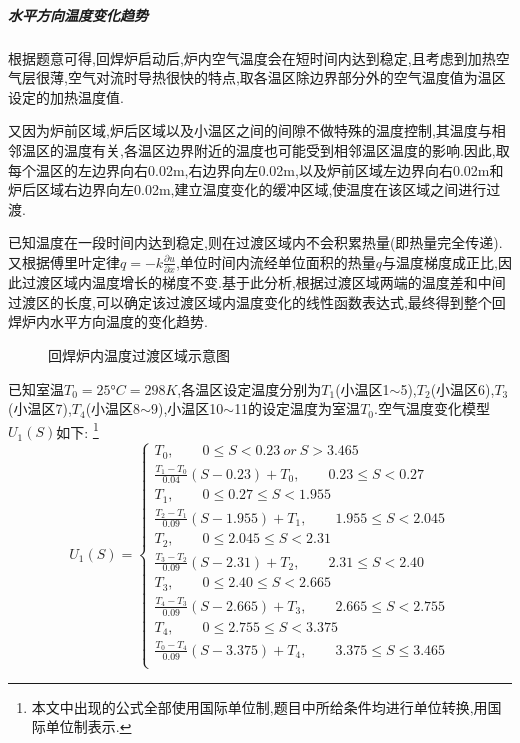 \documentclass[12pt]{ctexart}
\numberwithin{figure}{section}
\numberwithin{table}{section}
\begin{document}
\subparagraph{水平方向温度变化趋势}
根据题意可得,回焊炉启动后,炉内空气温度会在短时间内达到稳定,且考虑到加热空气层很薄,空气对流时导热很快的特点,取各温区除边界部分外的空气温度值为温区设定的加热温度值.

又因为炉前区域,炉后区域以及小温区之间的间隙不做特殊的温度控制,其温度与相邻温区的温度有关,各温区边界附近的温度也可能受到相邻温区温度的影响.因此,取每个温区的左边界向右0.02m,右边界向左0.02m,以及炉前区域左边界向右0.02m和炉后区域右边界向左0.02m,建立温度变化的缓冲区域,使温度在该区域之间进行过渡.

已知温度在一段时间内达到稳定,则在过渡区域内不会积累热量(即热量完全传递).又根据傅里叶定律$q=-k\frac{\partial u}{\partial x}$,单位时间内流经单位面积的热量$q$与温度梯度成正比,因此过渡区域内温度增长的梯度不变.基于此分析,根据过渡区域两端的温度差和中间过渡区的长度,可以确定该过渡区域内温度变化的线性函数表达式,最终得到整个回焊炉内水平方向温度的变化趋势.
\begin{figure}[!htp]
\centering
{}
\quad
{}
\caption{回焊炉内温度过渡区域示意图}
\end{figure}

已知室温$T_0=25°C=298K$,各温区设定温度分别为$T_1$(小温区1$\sim$5),$T_2$(小温区6),$T_3$(小温区7),$T_4$(小温区8$\sim$9),小温区10$\sim$11的设定温度为室温$T_0$.空气温度变化模型$U_1(S)$如下:
\footnote{本文中出现的公式全部使用国际单位制,题目中所给条件均进行单位转换,用国际单位制表示.}
\begin{equation}
U_1(S)=\left\{
\begin{array}{cc}
T_0,\quad\quad0\leq S<0.23\ or\ S>3.465\\
\frac{T_1-T_0}{0.04}(S-0.23)+T_0,\quad\quad 0.23\leq S<0.27\\
T_1,\quad\quad0\leq 0.27\leq S<1.955\\
\frac{T_2-T_1}{0.09}(S-1.955)+T_1,\quad\quad1.955\leq S<2.045\\
T_2,\quad\quad 0\leq 2.045\leq S<2.31\\
\frac{T_3-T_2}{0.09}(S-2.31)+T_2,\quad\quad 2.31\leq S<2.40\\
T_3,\quad\quad0\leq 2.40\leq S<2.665\\
\frac{T_4-T_3}{0.09}(S-2.665)+T_3,\quad\quad2.665\leq S<2.755\\
T_4,\quad\quad0\leq 2.755\leq S<3.375\\
\frac{T_0-T_4}{0.09}(S-3.375)+T_4,\quad\quad3.375\leq S\leq3.465\\
\end{array}\right. 
\end{equation}
\end{document}
